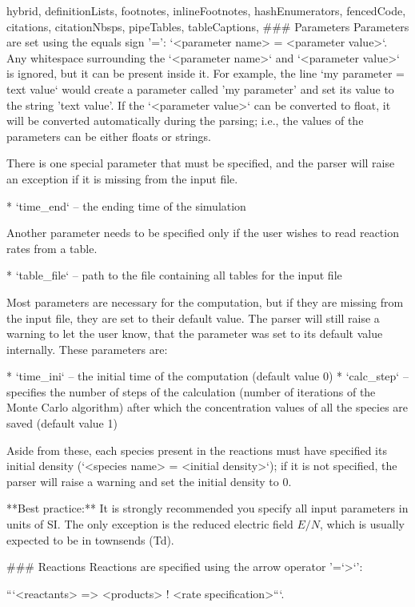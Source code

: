 \begin{markdown*}{%
  hybrid,
  definitionLists,
  footnotes,
  inlineFootnotes,
  hashEnumerators,
  fencedCode,
  citations,
  citationNbsps,
  pipeTables,
  tableCaptions,
}
### Parameters
Parameters are set using the equals sign '=': `<parameter name> = <parameter value>`. Any whitespace surrounding the `<parameter name>` and `<parameter value>` is ignored, but it can be present inside it. For example, the line `my parameter = text value` would create a parameter called 'my parameter' and set its value to the string 'text value'. If the `<parameter value>` can be converted to float, it will be converted automatically during the parsing; i.e., the values of the parameters can be either floats or strings.

There is one special parameter that must be specified, and the parser will raise an exception if
it is missing from the input file.

* `time_end` -- the ending time of the simulation

Another parameter needs to be specified only if the user wishes to read reaction rates from a table.

* `table_file` -- path to the file containing all tables for the input file

Most parameters are necessary for the computation, but if they are missing from the input file, 
they are set to their default value. The parser will still raise a warning to let the user know, 
that the parameter was set to its default value internally. These parameters are:

* `time_ini` -- the initial time of the computation (default value 0)
* `calc_step` -- specifies the number of steps of the calculation (number of iterations
of the Monte Carlo algorithm) after which the concentration values of all the species 
are saved (default value 1)

Aside from these, each species present in the reactions must have specified its initial density (`<species name> = <initial density>`); if it is not specified, the parser will raise a warning and set the initial density to 0.

\begin{shaded}{**Best practice:**}
     It is strongly recommended you specify all input parameters in units of SI. The only exception is the reduced electric field $E/N$, which is usually expected to be in townsends (Td).
\end{shaded}


### Reactions
Reactions are specified using the arrow operator '=`>`': 

```<reactants> => <products> ! <rate specification>```.


\end{markdown*}
